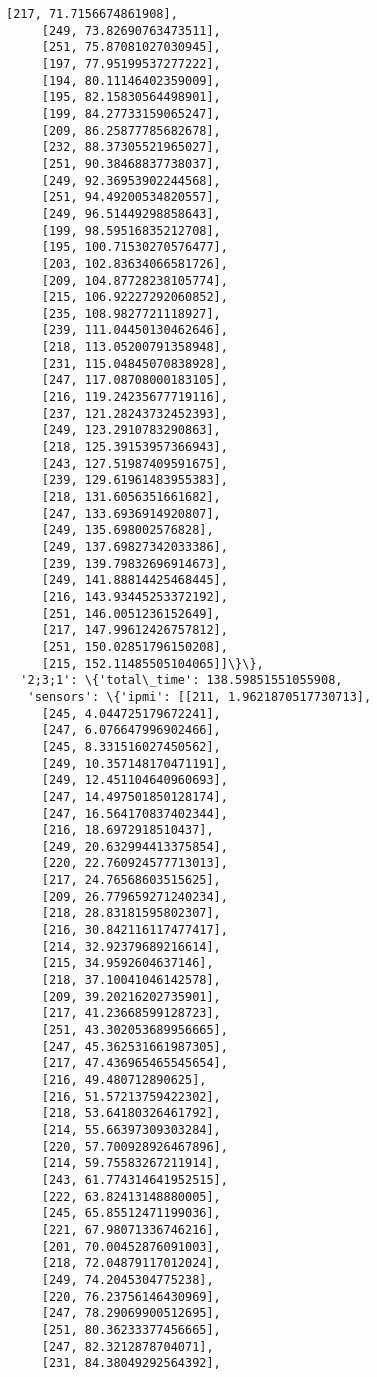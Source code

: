 \documentclass[11pt]{article}
\begin{document}
\begin{tcolorbox}[breakable, size=fbox, boxrule=.5pt, pad at break*=1mm, opacityfill=0]
\begin{Verbatim}[commandchars=\\\{\}]
     [217, 71.7156674861908],
     [249, 73.82690763473511],
     [251, 75.87081027030945],
     [197, 77.95199537277222],
     [194, 80.11146402359009],
     [195, 82.15830564498901],
     [199, 84.27733159065247],
     [209, 86.25877785682678],
     [232, 88.37305521965027],
     [251, 90.38468837738037],
     [249, 92.36953902244568],
     [251, 94.49200534820557],
     [249, 96.51449298858643],
     [199, 98.59516835212708],
     [195, 100.71530270576477],
     [203, 102.83634066581726],
     [209, 104.87728238105774],
     [215, 106.92227292060852],
     [235, 108.9827721118927],
     [239, 111.04450130462646],
     [218, 113.05200791358948],
     [231, 115.04845070838928],
     [247, 117.08708000183105],
     [216, 119.24235677719116],
     [237, 121.28243732452393],
     [249, 123.2910783290863],
     [218, 125.39153957366943],
     [243, 127.51987409591675],
     [239, 129.61961483955383],
     [218, 131.6056351661682],
     [247, 133.6936914920807],
     [249, 135.698002576828],
     [249, 137.69827342033386],
     [239, 139.79832696914673],
     [249, 141.88814425468445],
     [216, 143.93445253372192],
     [251, 146.0051236152649],
     [217, 147.99612426757812],
     [251, 150.02851796150208],
     [215, 152.11485505104065]]\}\},
  '2;3;1': \{'total\_time': 138.59851551055908,
   'sensors': \{'ipmi': [[211, 1.9621870517730713],
     [245, 4.044725179672241],
     [247, 6.076647996902466],
     [245, 8.331516027450562],
     [249, 10.357148170471191],
     [249, 12.451104640960693],
     [247, 14.497501850128174],
     [247, 16.564170837402344],
     [216, 18.6972918510437],
     [249, 20.632994413375854],
     [220, 22.760924577713013],
     [217, 24.76568603515625],
     [209, 26.779659271240234],
     [218, 28.83181595802307],
     [216, 30.842116117477417],
     [214, 32.92379689216614],
     [215, 34.9592604637146],
     [218, 37.10041046142578],
     [209, 39.20216202735901],
     [217, 41.23668599128723],
     [251, 43.302053689956665],
     [247, 45.362531661987305],
     [217, 47.436965465545654],
     [216, 49.480712890625],
     [216, 51.57213759422302],
     [218, 53.64180326461792],
     [214, 55.66397309303284],
     [220, 57.700928926467896],
     [214, 59.75583267211914],
     [243, 61.774314641952515],
     [222, 63.82413148880005],
     [245, 65.85512471199036],
     [221, 67.98071336746216],
     [201, 70.00452876091003],
     [218, 72.04879117012024],
     [249, 74.2045304775238],
     [220, 76.23756146430969],
     [247, 78.29069900512695],
     [251, 80.36233377456665],
     [247, 82.3212878704071],
     [231, 84.38049292564392],

\end{Verbatim}
\end{tcolorbox}
\end{document}
